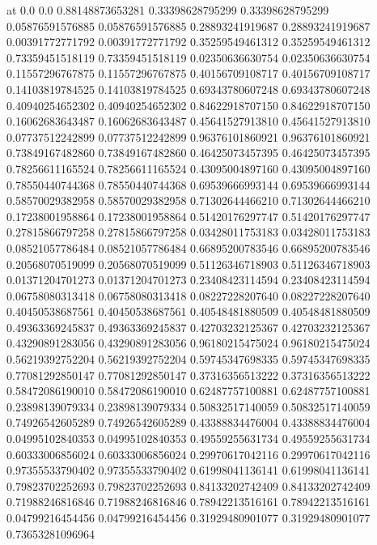  at
   0.0                0.0
   0.88148873653281   0.33398628795299
   0.33398628795299   0.05876591576885
   0.05876591576885   0.28893241919687
   0.28893241919687   0.00391772771792
   0.00391772771792   0.35259549461312
   0.35259549461312   0.73359451518119
   0.73359451518119   0.02350636630754
   0.02350636630754   0.11557296767875
   0.11557296767875   0.40156709108717
   0.40156709108717   0.14103819784525
   0.14103819784525   0.69343780607248
   0.69343780607248   0.40940254652302
   0.40940254652302   0.84622918707150
   0.84622918707150   0.16062683643487
   0.16062683643487   0.45641527913810
   0.45641527913810   0.07737512242899
   0.07737512242899   0.96376101860921
   0.96376101860921   0.73849167482860
   0.73849167482860   0.46425073457395
   0.46425073457395   0.78256611165524
   0.78256611165524   0.43095004897160
   0.43095004897160   0.78550440744368
   0.78550440744368   0.69539666993144
   0.69539666993144   0.58570029382958
   0.58570029382958   0.71302644466210
   0.71302644466210   0.17238001958864
   0.17238001958864   0.51420176297747
   0.51420176297747   0.27815866797258
   0.27815866797258   0.03428011753183
   0.03428011753183   0.08521057786484
   0.08521057786484   0.66895200783546
   0.66895200783546   0.20568070519099
   0.20568070519099   0.51126346718903
   0.51126346718903   0.01371204701273
   0.01371204701273   0.23408423114594
   0.23408423114594   0.06758080313418
   0.06758080313418   0.08227228207640
   0.08227228207640   0.40450538687561
   0.40450538687561   0.40548481880509
   0.40548481880509   0.49363369245837
   0.49363369245837   0.42703232125367
   0.42703232125367   0.43290891283056
   0.43290891283056   0.96180215475024
   0.96180215475024   0.56219392752204
   0.56219392752204   0.59745347698335
   0.59745347698335   0.77081292850147
   0.77081292850147   0.37316356513222
   0.37316356513222   0.58472086190010
   0.58472086190010   0.62487757100881
   0.62487757100881   0.23898139079334
   0.23898139079334   0.50832517140059
   0.50832517140059   0.74926542605289
   0.74926542605289   0.43388834476004
   0.43388834476004   0.04995102840353
   0.04995102840353   0.49559255631734
   0.49559255631734   0.60333006856024
   0.60333006856024   0.29970617042116
   0.29970617042116   0.97355533790402
   0.97355533790402   0.61998041136141
   0.61998041136141   0.79823702252693
   0.79823702252693   0.84133202742409
   0.84133202742409   0.71988246816846
   0.71988246816846   0.78942213516161
   0.78942213516161   0.04799216454456
   0.04799216454456   0.31929480901077
   0.31929480901077   0.73653281096964
